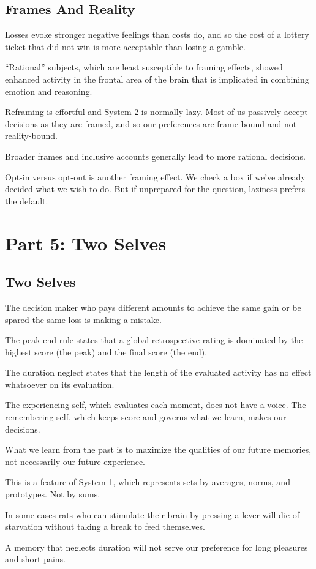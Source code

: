 \subsection*{Frames And Reality}

\bit
\item Losses evoke stronger negative feelings than costs do, and so the cost of a lottery ticket that did not win is
more acceptable than losing a gamble.
\item ``Rational'' subjects, which are least susceptible to framing effects, showed enhanced activity in the frontal
area of the brain that is implicated in combining emotion and reasoning.
\item Reframing is effortful and System 2 is normally lazy. Most of us passively accept decisions as they are framed,
and so our preferences are frame-bound and not reality-bound.
\item Broader frames and inclusive accounts generally lead to more rational decisions.
\item Opt-in versus opt-out is another framing effect. We check a box if we've already decided what we wish to do.
But if unprepared for the question, laziness prefers the default.
\eit

\section*{Part 5: Two Selves}

\subsection*{Two Selves}

\bit
\item The decision maker who pays different amounts to achieve the same gain or be spared the same loss is making a
mistake.
\item The peak-end rule states that a global retrospective rating is dominated by the highest score (the peak) and
the final score (the end).
\item The duration neglect states that the length of the evaluated activity has no effect whatsoever on its evaluation.
\item The experiencing self, which evaluates each moment, does not have a voice. The remembering self, which keeps
score and governs what we learn, makes our decisions.
\item What we learn from the past is to maximize the qualities of our future memories, not necessarily our future
experience.
\item This is a feature of System 1, which represents sets by averages, norms, and prototypes. Not by sums.
\item In some cases rats who can stimulate their brain by pressing a lever will die of starvation without taking a
break to feed themselves.
\item A memory that neglects duration will not serve our preference for long pleasures and short pains.
\eit

